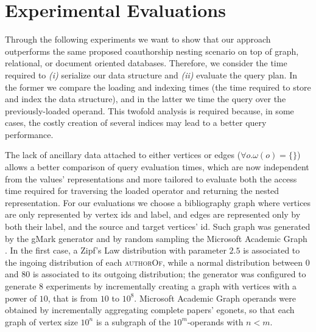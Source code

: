 

\section{Experimental Evaluations}\label{sec:nestexpeval}
Through the following experiments we want to show that our approach outperforms the same proposed coauthorship nesting scenario  on top of graph, relational, or document oriented databases. Therefore, we consider the time required to \textit{(i)}  serialize our data structure and \textit{(ii)} evaluate the query plan. In the former we compare the loading and indexing times (the time required to store and index the data structure), and in the latter  we time the query  over the previously-loaded operand. This twofold analysis is required because, in some cases, the costly creation of several indices may lead to a better query performance.

The lack of ancillary data attached to either vertices or edges ($\forall o. \omega(o)=\{\}$) allows a better comparison of query evaluation times, which are now independent from the values' representations and more tailored to evaluate both the  access time required for traversing the loaded operator and returning the nested representation.
For our evaluations we choose a bibliography graph where vertices are only represented by  vertex ids and  label, and edges are represented only by both their label, and the source and target vertices' id. Such graph was generated by the gMark generator \cite{BBCFLA17} and by random sampling the Microsoft Academic Graph \cite{Tang08,Sinha15}. In the first case, a Zipf's Law distribution with parameter $2.5$ is associated to the ingoing distribution  of each \textsc{authorOf}, while a normal distribution between $0$ and $80$ is associated to its outgoing distribution; the generator was configured to generate $8$ experiments by incrementally creating a graph with vertices with a power of $10$, that is from $10$ to $10^8$. %
Microsoft Academic Graph operands were obtained by incrementally aggregating complete papers' egonets, so that each graph of vertex size $10^n$ is a subgraph of the  $10^m$-operands with $n<m$.


